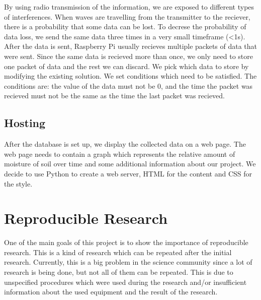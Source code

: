 \documentclass[conference]{IEEEtran}
\begin{document}

By using radio transmission of the information, we are exposed to different types of interferences.
When waves are travelling from the transmitter to the reciever, there is a probability that some data can be lost.
To decrese the probability of data loss, we send the same data three times in a very small timeframe (<1s).
After the data is sent, Raspberry Pi usually recieves multiple packets of data that were sent.
Since the same data is recieved more than once, we only need to store one packet of data and the rest we can discard.
We pick which data to store by modifying the existing solution.
We set conditions which need to be satisfied.
The conditions are: the value of the data must not be 0, and the time the packet was recieved must not be the same as the time the last packet was recieved.

\subsection{Hosting}


After the database is set up, we display the collected data on a web page.
The web page needs to contain a graph which represents the relative amount of moisture of soil over time and some additional information about our project.
We decide to use Python to create a web server, HTML for the content and CSS for the style.

\section{Reproducible Research}
\label{sec:reproducible}


One of the main goals of this project is to show the importance of reproducible research.
This is a kind of research which can be repeated after the initial research.
Currently, this is a big problem in the science community since a lot of research is being done, but not all of them can be repeated.
This is due to unspecified procedures which were used during the research and/or insufficient information about the used equipment and the result of the research.

\end{document}
